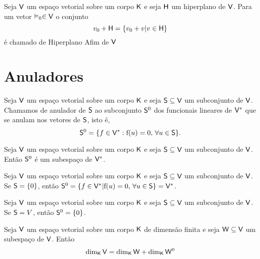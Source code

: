 \documentclass[10pt,a4paper]{book}
\begin{document}
\begin{definition}
	Seja $\mathsf{ V }$ um espaço vetorial sobre um corpo $\mathsf{ K }$ e seja $\mathsf{ H }$ um hiperplano de $\mathsf{ V }$. Para um vetor $\vDash_0 \in \mathsf{ V }$ o conjunto 
	\[
		v_0 + \mathsf{ H } = \{ v_0 + v | v \in \mathsf{ H } \}
	\]
	é chamado de Hiperplano Afim de $\mathsf{ V }$
\end{definition}




\section{Anuladores}

\begin{definition}
	Seja $\mathsf{ V }$ um espaço vetorial sobre um corpo $\mathsf{ K }$ e seja $\mathsf{ S } \subseteq \mathsf{ V }$ um subconjunto de $\mathsf{ V }$. Chamamos de anulador de $\mathsf{ S }$ ao subconjunto $\mathsf{ S } ^ 0$ dos funcionais lineares de $\mathsf{ V } ^ *$ que se anulam nos vetores de $\mathsf{ S }$, isto é, 
	\[
		\mathsf{ S } ^ 0 = \{ f \in \mathsf{ V } ^ * : \mathrm{ f }(u) = 0, \, \forall u \in \mathsf{ S } \}.
	\]
\end{definition}

\begin{lemma}
	Seja $\mathsf{ V }$ um espaço vetorial sobre um corpo $\mathsf{ K }$ e seja $\mathsf{ S } \subseteq \mathsf{ V }$ um subconjunto de $\mathsf{ V }$. Então $\mathsf{ S } ^ 0$ é um subespaço de $\mathsf{ V } ^ *$.
\end{lemma}

\begin{lemma}
	Seja $\mathsf{ V }$ um espaço vetorial sobre um corpo $\mathsf{ K }$ e seja $\mathsf{ S } \subseteq \mathsf{ V }$ um subconjunto de $\mathsf{ V }$. Se $\mathsf{ S } = \{ 0 \}$, então $\mathsf{ S } ^ 0 = \{ f \in \mathsf{ V } ^ * | \mathrm{ f }(u) = 0, \, \forall u \in \mathsf{ S } \} = \mathsf{ V } ^ *$.
\end{lemma}

\begin{lemma}
	Seja $\mathsf{ V }$ um espaço vetorial sobre um corpo $\mathsf{ K }$ e seja $\mathsf{ S } \subseteq \mathsf{ V }$ um subconjunto de $\mathsf{ V }$. Se $\mathsf{ S } = V$, então $\mathsf{ S } ^ 0 = \{ 0 \}$.
\end{lemma}

\begin{theorem}
	Seja $\mathsf{ V }$ um espaço vetorial sobre um corpo $\mathsf{ K }$ de dimensão finita e seja $\mathsf{ W } \subseteq \mathsf{ V }$ um subespaço de $\mathsf{ V }$. Então
	\[
		\dim_{\mathsf{ K }} \mathsf{ V } = \dim_{\mathsf{ K }} \mathsf{ W } + \dim_{\mathsf{ K }} \mathsf{ W } ^ 0
	\]
\end{theorem}
\end{document}
